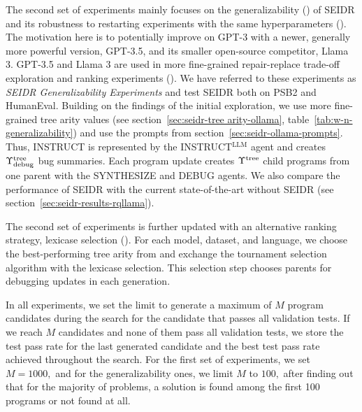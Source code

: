 The second set of experiments mainly focuses on the generalizability (\rqllama{}) of SEIDR
and its robustness to restarting experiments with the same hyperparameters (\rqmultirun{}).
The motivation here is to potentially improve on GPT-3 with a newer, generally more powerful version, GPT-3.5, and its smaller open-source competitor, Llama 3.
GPT-3.5 and Llama 3 are used in more fine-grained repair-replace trade-off exploration and ranking experiments (\rqtreearity{}). 
We have referred to these experiments as \emph{SEIDR Generalizability Experiments} and test SEIDR both on PSB2 and HumanEval.
Building on the findings of the initial exploration, we use more fine-grained tree arity values (see section~\ref{sec:seidr-tree arity-ollama}, table~\ref{tab:w-n-generalizability}) and use the prompts from section~\ref{sec:seidr-ollama-prompts}. 
Thus, INSTRUCT is represented by the INSTRUCT$^{\text{LLM}}$ agent and creates $\Upsilon^\text{tree}_\text{debug}$ bug summaries.
Each program update creates $\Upsilon^\text{tree}{}$ child programs from one parent with the SYNTHESIZE and DEBUG agents.
We also compare the performance of SEIDR with the current state-of-the-art without SEIDR (see section~\ref{sec:seidr-results-rqllama}).

The second set of experiments is further updated with an alternative ranking strategy, lexicase selection (\rqlexicase{}). 
For each model, dataset, and language, we choose the best-performing tree arity from \rqllama{} and exchange the tournament selection algorithm with the lexicase selection. 
This selection step chooses parents for debugging updates in each generation. 


In all experiments, we set the limit to generate a maximum of $M$ program candidates during the search for the candidate that passes all validation tests. 
If we reach $M$ candidates and none of them pass all validation tests, we store the test pass rate for the last generated candidate and the best test pass rate achieved throughout the search. 
For the first set of experiments, we set $M = 1000,$ and for the generalizability ones, we limit $M$  to $100,$ after finding out that for the majority of problems, a solution is found among the first 100 programs or not found at all.



